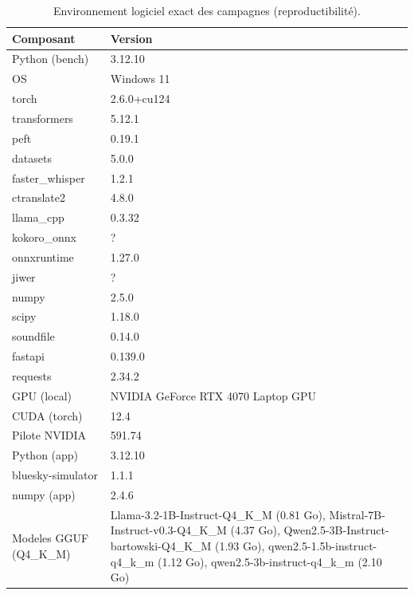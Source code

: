 \begin{table}[t]\centering\small
\caption{Environnement logiciel exact des campagnes (reproductibilité).}
\label{tab:versions}
\begin{tabular}{ll}
\toprule
Composant & Version \\
\midrule
Python (bench) & 3.12.10 \\
OS & Windows 11 \\
torch & 2.6.0+cu124 \\
transformers & 5.12.1 \\
peft & 0.19.1 \\
datasets & 5.0.0 \\
faster\_whisper & 1.2.1 \\
ctranslate2 & 4.8.0 \\
llama\_cpp & 0.3.32 \\
kokoro\_onnx & ? \\
onnxruntime & 1.27.0 \\
jiwer & ? \\
numpy & 2.5.0 \\
scipy & 1.18.0 \\
soundfile & 0.14.0 \\
fastapi & 0.139.0 \\
requests & 2.34.2 \\
GPU (local) & NVIDIA GeForce RTX 4070 Laptop GPU \\
CUDA (torch) & 12.4 \\
Pilote NVIDIA & 591.74 \\
Python (app) & 3.12.10 \\
bluesky-simulator & 1.1.1 \\
numpy (app) & 2.4.6 \\
Modeles GGUF (Q4\_K\_M) & Llama-3.2-1B-Instruct-Q4\_K\_M (0.81 Go), Mistral-7B-Instruct-v0.3-Q4\_K\_M (4.37 Go), Qwen2.5-3B-Instruct-bartowski-Q4\_K\_M (1.93 Go), qwen2.5-1.5b-instruct-q4\_k\_m (1.12 Go), qwen2.5-3b-instruct-q4\_k\_m (2.10 Go) \\
\bottomrule
\end{tabular}
\end{table}
